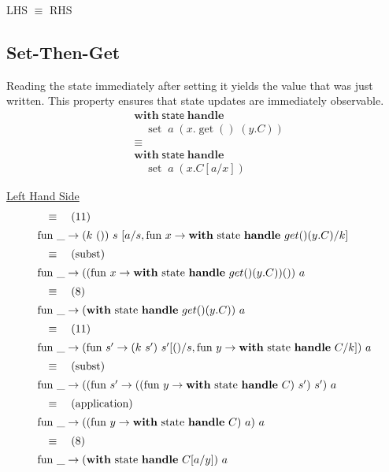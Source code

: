 \documentclass[logo,bsc,singlespacing,parskip]{infthesis}
\begin{document}
LHS $\equiv$ RHS



\subsection{Set-Then-Get}
Reading the state immediately after setting it yields the value that was just written. This property ensures that state updates are immediately observable.
\[
\begin{aligned}
    &\mathsf{\textbf{with}} \; \mathsf{state} \; \mathsf{\textbf{handle}} \\
    &\quad \operatorname{set} \; a \; (x. \operatorname{get}() \; (y. C)) \\
    &\equiv \\
    &\mathsf{\textbf{with}} \; \mathsf{state} \; \mathsf{\textbf{handle}} \\
    &\quad \operatorname{set} \; a \; (x. C[a/x])
\end{aligned}
\]

\underline{Left Hand Side}
\[ 
\begin{array}{l}
\quad\equiv\quad (11) \\[5pt]
\text{fun }\_ \rightarrow (k\ ())\ s\ [a/s, \text{fun } x \rightarrow \text{\textbf{with} state \textbf{handle} } get() (y. C)/k] \\[5pt]
\quad\equiv\quad (\text{subst}) \\[5pt]
\text{fun }\_ \rightarrow ((\text{fun } x \rightarrow \text{\textbf{with} state \textbf{handle} } get() (y. C)) ())\ a \\[5pt]
\quad\equiv\quad (8) \\[5pt]
\text{fun }\_ \rightarrow (\text{\textbf{with} state \textbf{handle} } get() (y. C))\ a \\[5pt]
\quad\equiv\quad (11) \\[5pt]
\text{fun }\_ \rightarrow (\text{fun } s' \rightarrow  (k\ s')\ s' [()/s, \text{fun } y \rightarrow \text{\textbf{with} state \textbf{handle} } C / k])\ a \\[5pt]
\quad\equiv\quad (\text{subst}) \\[5pt]
\text{fun }\_ \rightarrow ((\text{fun } s' \rightarrow ((\text{fun } y \rightarrow \text{\textbf{with} state \textbf{handle} } C)\ s' )\ s')\ a \\[5pt]
\quad\equiv\quad (\text{application}) \\[5pt]
\text{fun }\_ \rightarrow ((\text{fun } y \rightarrow \text{\textbf{with} state \textbf{handle} } C)\ a )\ a \\[5pt]
\quad\equiv\quad (8) \\[5pt]
\text{fun }\_ \rightarrow (\text{\textbf{with} state \textbf{handle} } C[a/y])\ a
\end{array}
\]
\end{document}
